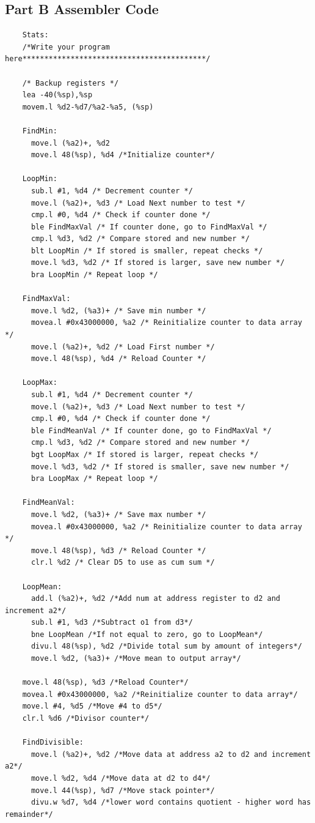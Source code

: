 \documentclass[10pt, letterpaper, titlepage]{article} %
\begin{document}
\subsection{Part B Assembler Code}
\begin{lstlisting}
	Stats:
	/*Write your program here******************************************/
	
	/* Backup registers */
	lea -40(%sp),%sp
	movem.l %d2-%d7/%a2-%a5, (%sp)
	
	FindMin:
	  move.l (%a2)+, %d2
	  move.l 48(%sp), %d4 /*Initialize counter*/
	
	LoopMin:
	  sub.l #1, %d4 /* Decrement counter */
	  move.l (%a2)+, %d3 /* Load Next number to test */
	  cmp.l #0, %d4 /* Check if counter done */
	  ble FindMaxVal /* If counter done, go to FindMaxVal */
	  cmp.l %d3, %d2 /* Compare stored and new number */
	  blt LoopMin /* If stored is smaller, repeat checks */
	  move.l %d3, %d2 /* If stored is larger, save new number */
	  bra LoopMin /* Repeat loop */
	
	FindMaxVal:
	  move.l %d2, (%a3)+ /* Save min number */
	  movea.l #0x43000000, %a2 /* Reinitialize counter to data array */
	  move.l (%a2)+, %d2 /* Load First number */
	  move.l 48(%sp), %d4 /* Reload Counter */
	
	LoopMax:
	  sub.l #1, %d4 /* Decrement counter */
	  move.l (%a2)+, %d3 /* Load Next number to test */
	  cmp.l #0, %d4 /* Check if counter done */
	  ble FindMeanVal /* If counter done, go to FindMaxVal */
	  cmp.l %d3, %d2 /* Compare stored and new number */
	  bgt LoopMax /* If stored is larger, repeat checks */
	  move.l %d3, %d2 /* If stored is smaller, save new number */
	  bra LoopMax /* Repeat loop */
	
	FindMeanVal:
	  move.l %d2, (%a3)+ /* Save max number */
	  movea.l #0x43000000, %a2 /* Reinitialize counter to data array */
	  move.l 48(%sp), %d3 /* Reload Counter */
	  clr.l %d2 /* Clear D5 to use as cum sum */
	
	LoopMean:
	  add.l (%a2)+, %d2 /*Add num at address register to d2 and increment a2*/
	  sub.l #1, %d3 /*Subtract o1 from d3*/
	  bne LoopMean /*If not equal to zero, go to LoopMean*/
	  divu.l 48(%sp), %d2 /*Divide total sum by amount of integers*/
	  move.l %d2, (%a3)+ /*Move mean to output array*/
	
	move.l 48(%sp), %d3 /*Reload Counter*/
	movea.l #0x43000000, %a2 /*Reinitialize counter to data array*/
	move.l #4, %d5 /*Move #4 to d5*/
	clr.l %d6 /*Divisor counter*/
	
	FindDivisible:
	  move.l (%a2)+, %d2 /*Move data at address a2 to d2 and increment a2*/
	  move.l %d2, %d4 /*Move data at d2 to d4*/
	  move.l 44(%sp), %d7 /*Move stack pointer*/
	  divu.w %d7, %d4 /*lower word contains quotient - higher word has remainder*/
	

\end{lstlisting}
\end{document}
